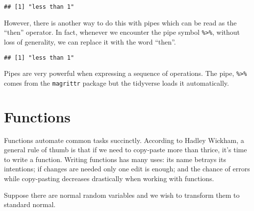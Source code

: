 \documentclass[]{article}
\newenvironment{Shaded}{\begin{snugshade}}{\end{snugshade}}
\newcommand{\KeywordTok}[1]{\textcolor[rgb]{0.13,0.29,0.53}{\textbf{#1}}}
\newcommand{\DecValTok}[1]{\textcolor[rgb]{0.00,0.00,0.81}{#1}}
\newcommand{\StringTok}[1]{\textcolor[rgb]{0.31,0.60,0.02}{#1}}
\newcommand{\CommentTok}[1]{\textcolor[rgb]{0.56,0.35,0.01}{\textit{#1}}}
\newcommand{\ControlFlowTok}[1]{\textcolor[rgb]{0.13,0.29,0.53}{\textbf{#1}}}
\newcommand{\OperatorTok}[1]{\textcolor[rgb]{0.81,0.36,0.00}{\textbf{#1}}}
\newcommand{\NormalTok}[1]{#1}
\begin{document}
\begin{verbatim}
## [1] "less than 1"
\end{verbatim}

However, there is another way to do this with pipes which can be read as
the ``then'' operator. In fact, whenever we encounter the pipe symbol
\texttt{\%\textgreater{}\%}, without loss of generality, we can replace
it with the word ``then''.

\begin{Shaded}
\end{Shaded}

\begin{verbatim}
## [1] "less than 1"
\end{verbatim}

Pipes are very powerful when expressing a sequence of operations. The
pipe, \texttt{\%\textgreater{}\%} comes from the \texttt{magrittr}
package but the tidyverse loads it automatically.

\section{Functions}\label{functions}

Functions automate common tasks succinctly. According to Hadley Wickham,
a general rule of thumb is that if we need to copy-paste more than
thrice, it's time to write a function. Writing functions has many uses:
its name betrays its intentions; if changes are needed only one edit is
enough; and the chance of errors while copy-pasting decreases
drastically when working with functions.

Suppose there are normal random variables and we wish to transform them
to standard normal.
\end{document}

